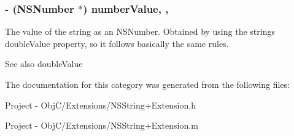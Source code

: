 \subsubsection[{number\+Value}]{\setlength{\rightskip}{0pt plus 5cm}-\/ (N\+S\+Number $\ast$) number\+Value\hspace{0.3cm}{\ttfamily [read]}, {\ttfamily [nonatomic]}, {\ttfamily [weak]}}\label{category_n_s_string_07_extension_08_ab13add9925c9328d12901fd5921627c8}
The value of the string as an N\+S\+Number. Obtained by using the string\textquotesingle{}s double\+Value property, so it follows basically the same rules. \begin{DoxySeeAlso}{See also}
double\+Value 
\end{DoxySeeAlso}


The documentation for this category was generated from the following files\+:\begin{DoxyCompactItemize}
\item 
Project -\/ Obj\+C/\+Extensions/N\+S\+String+\+Extension.\+h\item 
Project -\/ Obj\+C/\+Extensions/N\+S\+String+\+Extension.\+m\end{DoxyCompactItemize}

